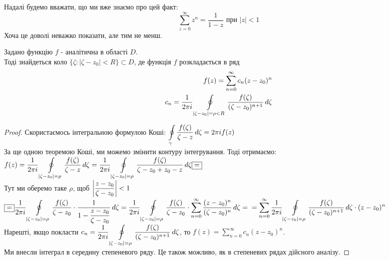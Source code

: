 \documentclass{math_library}
\begin{document}
Надалі будемо вважати, що ми вже знаємо про цей факт: $$\displaystyle \sum_{z=0}^{\infty} z^n = \frac{1}{1-z} \text{ при } |z|<1$$
Хоча це доволі неважко показати, але тим не менш.

\begin{theorem}
Задано функцію $f$ - аналітична в області $D$.\\ Тоді знайдеться коло $\{\zeta: |\zeta-z_0|<R\} \subset D$, де функція $f$ розкладається в ряд
\begin{align*}
	f(z) = \sum_{n=0}^{\infty} c_n(z-z_0)^n \\
	c_n = \frac{1}{2\pi i} \oint\displaylimits_{|\zeta-z_0|=\rho<R} \frac{f(\zeta)}{(\zeta-z_0)^{n+1}}\,d\zeta
\end{align*}
\end{theorem}

\begin{proof}
Скористаємось інтегральною формулою Коші:
	$\displaystyle \oint\displaylimits_{\gamma} \frac{f(\zeta)}{\zeta-z}\,d\zeta = 2\pi i f(z)$\\
	За ще одною теоремою Коші, ми можемо змінити контуру інтегрування. Тоді отримаємо:\\
	$f(z) = \displaystyle \frac{1}{2\pi i} \oint\displaylimits_{|\zeta-z_0|=\rho} \frac{f(\zeta)}{\zeta-z}\,d\zeta = \frac{1}{2\pi i}\oint\displaylimits_{|\zeta-z_0|=\rho} \frac{f(\zeta)}{\zeta-z_0+z_0-z}\,d\zeta \boxed{=}$\\
	Тут ми оберемо таке $\rho$, щоб $\displaystyle \abs{\frac{z-z_0}{\zeta - z_0}}<1$\\
	$\boxed{=} \displaystyle \frac{1}{2\pi i} \oint\displaylimits_{|\zeta-z_0|=\rho} \frac{f(\zeta)}{\zeta-z_0} \cdot \frac{1}{\displaystyle 1- \frac{z-z_0}{\zeta -z_0}} \,d\zeta = \frac{1}{2\pi i}\oint\displaylimits_{|\zeta-z_0|=\rho} \frac{f(\zeta)}{\zeta-z_0} \cdot \sum_{n=0}^{\infty} \frac{(z-z_0)^n}{(\zeta-z_0)^n} \,d\zeta = \\ = \sum_{n=0}^{\infty}\frac{1}{2\pi i} \oint\displaylimits_{|\zeta-z_0|=\rho} \frac{f(\zeta)}{(\zeta-z_0)^{n+1}} \,d\zeta \cdot (z-z_0)^n$\\
	Нарешті, якщо покласти $c_n = \displaystyle\frac{1}{2\pi i}\oint\displaylimits_{|\zeta-z_0|=\rho} \frac{f(\zeta)}{(\zeta-z_0)^{n+1}} \,d\zeta$, то $f(z) = \displaystyle\sum_{n=0}^{\infty} c_n(z-z_0)^n$.\\
	Ми внесли інтеграл в середину степеневого ряду. Це також можливо, як в степеневих рядах дійсного аналізу.
\end{proof}
\end{document}
